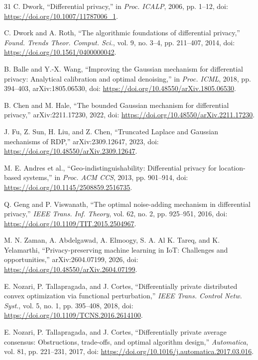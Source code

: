 \documentclass[10pt]{article}
\begin{document}
\begin{thebibliography}{31}
C. Dwork, ``Differential privacy,'' in \emph{Proc. ICALP}, 2006, pp. 1--12, doi: \url{https://doi.org/10.1007/11787006_1}.

C. Dwork and A. Roth, ``The algorithmic foundations of differential privacy,'' \emph{Found. Trends Theor. Comput. Sci.}, vol. 9, no. 3--4, pp. 211--407, 2014, doi: \url{https://doi.org/10.1561/0400000042}.

B. Balle and Y.-X. Wang, ``Improving the Gaussian mechanism for differential privacy: Analytical calibration and optimal denoising,'' in \emph{Proc. ICML}, 2018, pp. 394--403, arXiv:1805.06530, doi: \url{https://doi.org/10.48550/arXiv.1805.06530}.

B. Chen and M. Hale, ``The bounded Gaussian mechanism for differential privacy,'' arXiv:2211.17230, 2022, doi: \url{https://doi.org/10.48550/arXiv.2211.17230}.

J. Fu, Z. Sun, H. Liu, and Z. Chen, ``Truncated Laplace and Gaussian mechanisms of RDP,'' arXiv:2309.12647, 2023, doi: \url{https://doi.org/10.48550/arXiv.2309.12647}.

M. E. Andres et al., ``Geo-indistinguishability: Differential privacy for location-based systems,'' in \emph{Proc. ACM CCS}, 2013, pp. 901--914, doi: \url{https://doi.org/10.1145/2508859.2516735}.

Q. Geng and P. Viswanath, ``The optimal noise-adding mechanism in differential privacy,'' \emph{IEEE Trans. Inf. Theory}, vol. 62, no. 2, pp. 925--951, 2016, doi: \url{https://doi.org/10.1109/TIT.2015.2504967}.

M. N. Zaman, A. Abdelgawad, A. Elmoogy, S. A. Al K. Tareq, and K. Yelamarthi, ``Privacy-preserving machine learning in IoT: Challenges and opportunities,'' arXiv:2604.07199, 2026, doi: \url{https://doi.org/10.48550/arXiv.2604.07199}.

E. Nozari, P. Tallapragada, and J. Cortes, ``Differentially private distributed convex optimization via functional perturbation,'' \emph{IEEE Trans. Control Netw. Syst.}, vol. 5, no. 1, pp. 395--408, 2018, doi: \url{https://doi.org/10.1109/TCNS.2016.2614100}.

E. Nozari, P. Tallapragada, and J. Cortes, ``Differentially private average consensus: Obstructions, trade-offs, and optimal algorithm design,'' \emph{Automatica}, vol. 81, pp. 221--231, 2017, doi: \url{https://doi.org/10.1016/j.automatica.2017.03.016}.


\end{thebibliography}
\end{document}
